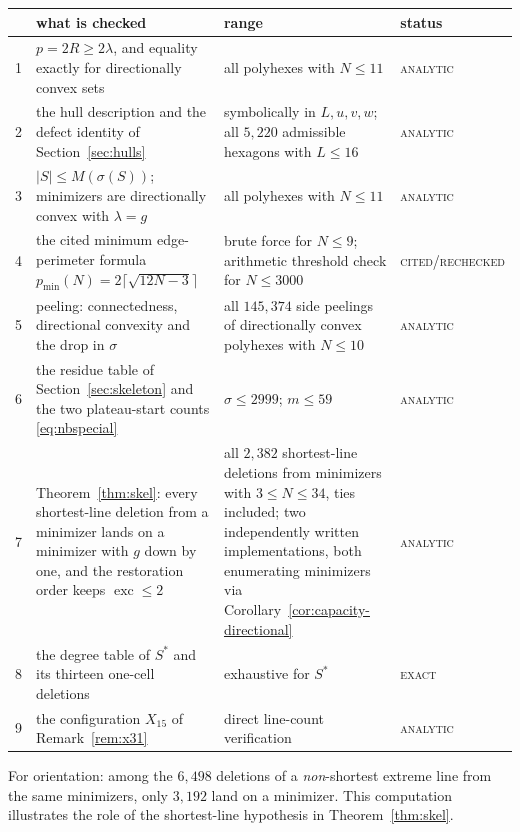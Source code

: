 \documentclass[11pt]{article}
\theoremstyle{plain}
\theoremstyle{definition}
\theoremstyle{remark}
\DeclareMathOperator{\exc}{exc}
\begin{document}
\begin{center}
\footnotesize
\begin{tabularx}{\linewidth}{@{}l>{\raggedright\arraybackslash}X>{\raggedright\arraybackslash}Xl@{}}
\toprule
 & what is checked & range & status \\
\midrule
1 & \(p=2R\ge2\lambda\), and equality exactly for directionally convex sets &
all polyhexes with \(N\le11\) & \textsc{analytic} \\
2 & the hull description and the defect identity of Section~\ref{sec:hulls} &
symbolically in \(L,u,v,w\); all \(5{,}220\) admissible hexagons with \(L\le16\) &
\textsc{analytic} \\
3 & \(|S|\le M(\sigma(S))\); minimizers are directionally convex with \(\lambda=g\) &
all polyhexes with \(N\le11\) & \textsc{analytic} \\
4 & the cited minimum edge-perimeter formula
\(p_{\min}(N)=2\lceil\sqrt{12N-3}\rceil\) &
brute force for \(N\le9\); arithmetic threshold check for \(N\le3000\) &
\textsc{cited/rechecked} \\
5 & peeling: connectedness, directional convexity and the drop in \(\sigma\) &
all \(145{,}374\) side peelings of directionally convex polyhexes with \(N\le10\) &
\textsc{analytic} \\
6 & the residue table of Section~\ref{sec:skeleton} and the two plateau-start counts
\eqref{eq:nbspecial} & \(\sigma\le2999\); \(m\le59\) & \textsc{analytic} \\
7 & Theorem~\ref{thm:skel}: every shortest-line deletion from a minimizer lands on a
minimizer with \(g\) down by one, and the restoration order keeps \(\exc\le2\) &
all \(2{,}382\) shortest-line deletions from minimizers with \(3\le N\le34\), ties included;
two independently written implementations, both enumerating minimizers via
Corollary~\ref{cor:capacity-directional} & \textsc{analytic} \\
8 & the degree table of \(S^{*}\) and its thirteen one-cell deletions &
exhaustive for \(S^{*}\) & \textsc{exact} \\
9 & the configuration \(X_{15}\) of Remark~\ref{rem:x31} & direct line-count verification & \textsc{analytic} \\
\bottomrule
\end{tabularx}
\end{center}

For orientation: among the \(6{,}498\) deletions of a \emph{non}-shortest extreme line
from the same minimizers, only \(3{,}192\) land on a minimizer. This computation illustrates the role of the shortest-line hypothesis in
Theorem~\ref{thm:skel}.
\end{document}

